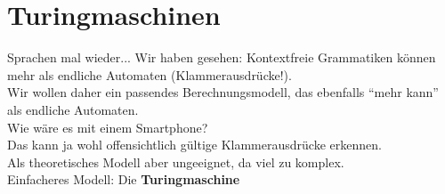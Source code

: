 \graphicspath{{../figures/}}

\newenvironment{Messtabelle}[1]
{\begin{minipage}{\linewidth} \centering  \begin{tabular}{#1} }
{\end{tabular} \vspace*{1em} \end{minipage}} 

\section{Turingmaschinen}

\begin{frame}{Sprachen mal wieder...}
	Wir haben gesehen: Kontextfreie Grammatiken können mehr als endliche Automaten (Klammerausdrücke!).\\
	Wir wollen daher ein passendes Berechnungsmodell, das ebenfalls \enquote{mehr \nolinebreak kann} als endliche Automaten.\\
	
	\medskip
	\pause
	Wie wäre es mit einem Smartphone?\\
	Das kann ja wohl offensichtlich gültige Klammerausdrücke erkennen.\\
	\pause
	Als theoretisches Modell aber ungeeignet, da viel zu komplex.\\
	\bigskip
	Einfacheres Modell: Die \textbf{Turingmaschine}
\end{frame}

